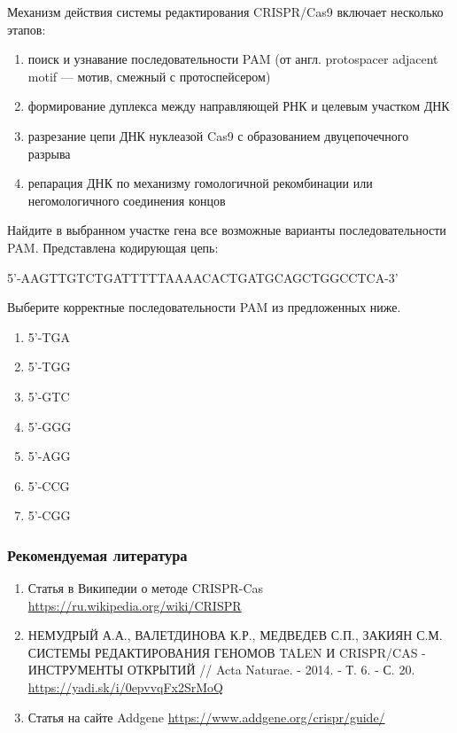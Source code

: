 
Механизм действия системы редактирования CRISPR/Cas9 включает несколько этапов:

\begin{enumerate}
    \item поиск и узнавание последовательности PAM (от англ. protospacer adjacent motif — мотив, смежный с протоспейсером)
    \item формирование дуплекса между направляющей РНК и целевым участком ДНК
    \item разрезание цепи ДНК нуклеазой Cas9 с образованием двуцепочечного разрыва
    \item репарация ДНК по механизму гомологичной рекомбинации или негомологичного соединения концов
\end{enumerate}

Найдите в выбранном участке гена все возможные варианты последовательности PAM. Представлена кодирующая цепь:

5'-AAGTTGTCTGATTTTTAAAACACTGATGCAGCTGGCCTCA-3'

Выберите корректные последовательности PAM из предложенных ниже.

\begin{enumerate}
    \item 5'-TGA
    \item 5'-TGG
    \item 5'-GTC
    \item 5'-GGG
    \item 5'-AGG
    \item 5'-CCG
    \item 5'-CGG
\end{enumerate}

\subsubsection*{Рекомендуемая литература}

\begin{enumerate}
    \item Статья в Википедии о методе CRISPR-Cas \url{https://ru.wikipedia.org/wiki/CRISPR}
    \item НЕМУДРЫЙ А.А., ВАЛЕТДИНОВА К.Р., МЕДВЕДЕВ С.П., ЗАКИЯН С.М. СИСТЕМЫ РЕДАКТИРОВАНИЯ ГЕНОМОВ TALEN И CRISPR/CAS - ИНСТРУМЕНТЫ ОТКРЫТИЙ // Acta Naturae. - 2014. - Т. 6. - С. 20.  \url{https://yadi.sk/i/0epvvqFx2SrMoQ}
    \item Статья на сайте Addgene \url{https://www.addgene.org/crispr/guide/}
\end{enumerate}